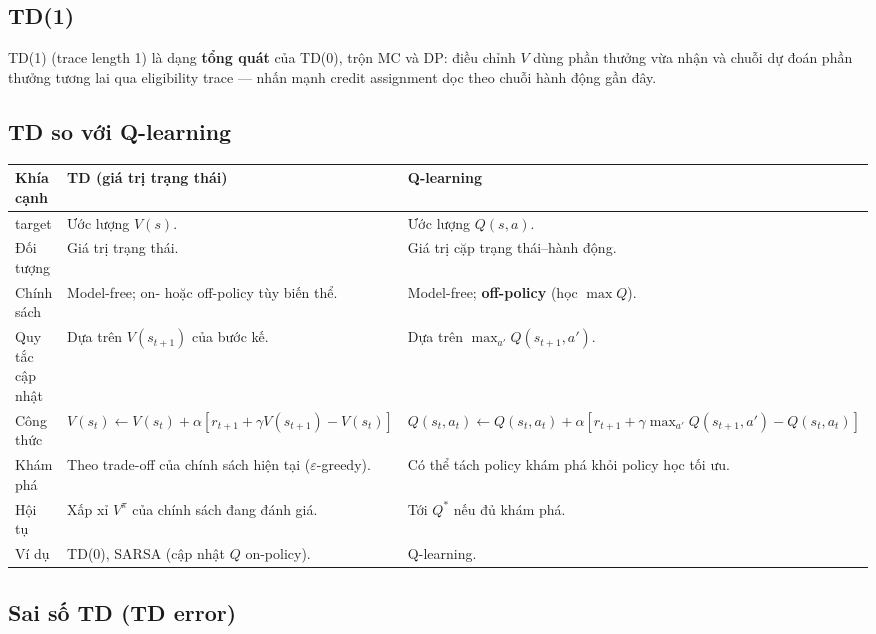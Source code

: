 \subsection{TD(1)}

\begin{ynghia}[title={TD(1)}]
TD(1) (trace length 1) là dạng \textbf{tổng quát} của TD(0), trộn MC và DP: điều chỉnh $V$ dùng phần thưởng vừa nhận và chuỗi dự đoán phần thưởng tương lai qua eligibility trace --- nhấn mạnh credit assignment dọc theo chuỗi hành động gần đây.
\end{ynghia}

\subsection{TD so với Q-learning}

\begin{vidu}[title={Bảng so sánh}]
\begin{tabularx}{\linewidth}{>{\raggedright\arraybackslash}p{3.2cm}XX}
\textbf{Khía cạnh} & \textbf{TD (giá trị trạng thái)} & \textbf{Q-learning} \\
\midrule
target &
Ước lượng $V(s)$. &
Ước lượng $Q(s,a)$. \\
Đối tượng &
Giá trị trạng thái. &
Giá trị cặp trạng thái--hành động. \\
Chính sách &
Model-free; on- hoặc off-policy tùy biến thể. &
Model-free; \textbf{off-policy} (học $\max Q$). \\
Quy tắc cập nhật &
Dựa trên $V(s_{t+1})$ của bước kế. &
Dựa trên $\max_{a'} Q(s_{t+1},a')$. \\
Công thức &
$V(s_t) \leftarrow V(s_t) + \alpha[r_{t+1} + \gamma V(s_{t+1}) - V(s_t)]$ &
$Q(s_t,a_t) \leftarrow Q(s_t,a_t) + \alpha[r_{t+1} + \gamma \max_{a'} Q(s_{t+1},a') - Q(s_t,a_t)]$ \\
Khám phá &
Theo trade-off của chính sách hiện tại ($\varepsilon$-greedy). &
Có thể tách policy khám phá khỏi policy học tối ưu. \\
Hội tụ &
Xấp xỉ $V^\pi$ của chính sách đang đánh giá. &
Tới $Q^*$ nếu đủ khám phá. \\
Ví dụ &
TD(0), SARSA (cập nhật $Q$ on-policy). &
Q-learning. \\
\end{tabularx}
\end{vidu}

\subsection{Sai số TD (TD error)}

